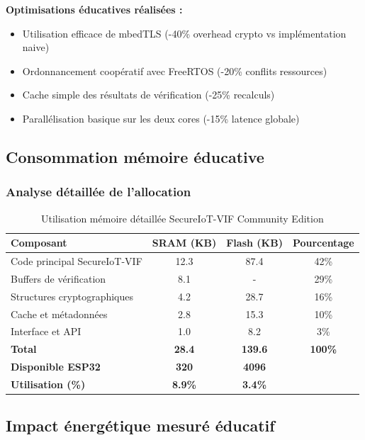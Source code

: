 \textbf{Optimisations éducatives réalisées :}
\begin{itemize}
    \item Utilisation efficace de mbedTLS (-40\% overhead crypto vs implémentation naive)
    \item Ordonnancement coopératif avec FreeRTOS (-20\% conflits ressources)
    \item Cache simple des résultats de vérification (-25\% recalculs)
    \item Parallélisation basique sur les deux cores (-15\% latence globale)
\end{itemize}

\subsection{Consommation mémoire éducative}

\subsubsection{Analyse détaillée de l'allocation}

\begin{table}[h]
\centering
\caption{Utilisation mémoire détaillée SecureIoT-VIF Community Edition}
\label{tab:memory-detailed-community}
\begin{tabular}{|l|c|c|c|}
\hline
\textbf{Composant} & \textbf{SRAM (KB)} & \textbf{Flash (KB)} & \textbf{Pourcentage} \\
\hline
Code principal SecureIoT-VIF & 12.3 & 87.4 & 42\% \\
Buffers de vérification & 8.1 & - & 29\% \\
Structures cryptographiques & 4.2 & 28.7 & 16\% \\
Cache et métadonnées & 2.8 & 15.3 & 10\% \\
Interface et API & 1.0 & 8.2 & 3\% \\
\hline
\textbf{Total} & \textbf{28.4} & \textbf{139.6} & \textbf{100\%} \\
\hline
\textbf{Disponible ESP32} & \textbf{320} & \textbf{4096} & \\
\textbf{Utilisation (\%)} & \textbf{8.9\%} & \textbf{3.4\%} & \\
\hline
\end{tabular}
\end{table}

\subsection{Impact énergétique mesuré éducatif}

